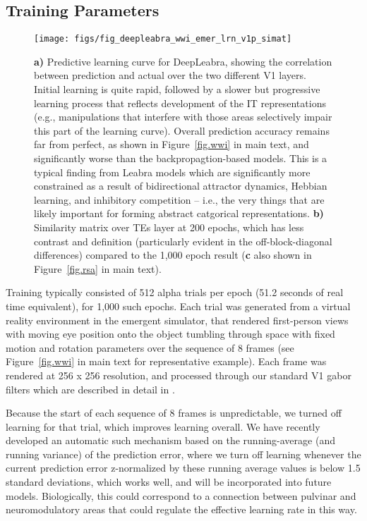 \subsection{Training Parameters}

\begin{figure}
  \centering\texttt{[image: figs/fig\_deepleabra\_wwi\_emer\_lrn\_v1p\_simat]}
  \caption{\footnotesize {\bf a)} Predictive learning curve for DeepLeabra, showing the correlation between prediction and actual over the two different V1 layers.  Initial learning is quite rapid, followed by a slower but progressive learning process that reflects development of the IT representations (e.g., manipulations that interfere with those areas selectively impair this part of the learning curve).  Overall prediction accuracy remains far from perfect, as shown in Figure~\ref{fig.wwi} in main text, and significantly worse than the backpropagtion-based models.  This is a typical finding from Leabra models which are significantly more constrained as a result of bidirectional attractor dynamics, Hebbian learning, and inhibitory competition -- i.e., the very things that are likely important for forming abstract catgorical representations. {\bf b)} Similarity matrix over TEs layer at 200 epochs, which has less contrast and definition (particularly evident in the off-block-diagonal differences) compared to the 1,000 epoch result ({\bf c} also shown in Figure~\ref{fig.rsa} in main text).}
  \label{fig.lrn}
\end{figure}

Training typically consisted of 512 alpha trials per epoch (51.2 seconds of real time equivalent), for 1,000 such epochs. Each trial was generated from a virtual reality environment in the emergent simulator, that rendered first-person views with moving eye position onto the object tumbling through space with fixed motion and rotation parameters over the sequence of 8 frames (see Figure~\ref{fig.wwi} in main text for representative example).  Each frame was rendered at 256 x 256 resolution, and processed through our standard V1 gabor filters which are described in detail in \citet{OReillyWyatteHerdEtAl13}.

Because the start of each sequence of 8 frames is unpredictable, we turned off learning for that trial, which improves learning overall.  We have recently developed an automatic such mechanism based on the running-average (and running variance) of the prediction error, where we turn off learning whenever the current prediction error z-normalized by these running average values is below 1.5 standard deviations, which works well, and will be incorporated into future models.  Biologically, this could correspond to a connection between pulvinar and neuromodulatory areas that could regulate the effective learning rate in this way.

